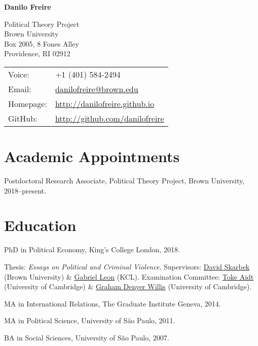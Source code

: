 \documentclass[a4paper]{article}
\def\name{Danilo Freire}
\renewenvironment{itemize}{
	\begin{list}{}{
			\setlength{\leftmargin}{1.5em}
		}
		}{
	\end{list}
}
\begin{document}
{\huge \bf \name}


\vspace{0.25in}

\begin{minipage}{0.45\linewidth}
	Political Theory Project \\
	Brown University \\
	Box 2005, 8 Fones Alley \\
	Providence, RI 02912
\end{minipage}
\begin{minipage}{0.45\linewidth}
	\begin{tabular}{ll}
		Voice: & +1 (401) 584-2494 \\
		Email:          & \href{mailto:danilofreire@brown.edu}{danilofreire@brown.edu}          \\
		Homepage:       & \href{http://danilofreire.github.io/}{http://danilofreire.github.io}   \\
		GitHub:         & \href{http://github.com/danilofreire}{http://github.com/danilofreire}
	\end{tabular}
	\end{minipage}

\section*{Academic Appointments}

\begin{itemize}
\item Postdoctoral Research Associate, Political Theory Project, Brown University, 2018--present.
\end{itemize}

\section*{Education}

\begin{itemize}
\item PhD in Political Economy, King's College London, 2018.
\begin{itemize}
\item Thesis: \textit{Essays on Political and Criminal Violence}. Supervisors: \href{http://davidskarbek.com}{David Skarbek} (Brown University) \& \href{https://gabrieljleon.wordpress.com/}{Gabriel Leon} (KCL). Examination Committee: \href{http://www.econ.cam.ac.uk/people/faculty/tsa23}{Toke Aidt} (University of Cambridge) \& \href{http://www.grahamdenyerwillis.com}{Graham Denyer Willis} (University of Cambridge).
\end{itemize}
\item MA in International Relations, The Graduate Institute Geneva, 2014.
\item MA in Political Science, University of São Paulo, 2011.
\item BA in Social Sciences, University of São Paulo, 2007.
\end{itemize}
\end{document}
